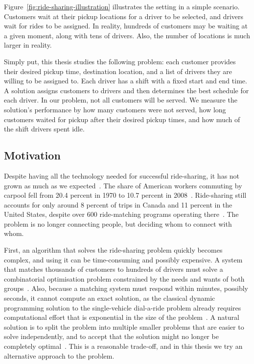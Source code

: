 Figure~\ref{fig:ride-sharing-illustration} illustrates the setting in a simple scenario. Customers wait at their pickup locations for a driver to be selected, and drivers wait for rides to be assigned. In reality, hundreds of customers may be waiting at a given moment, along with tens of drivers. Also, the number of locations is much larger in reality.

Simply put, this thesis studies the following problem: each customer provides their desired pickup time, destination location, and a list of drivers they are willing to be assigned to. Each driver has a shift with a fixed start and end time. A solution assigns customers to drivers and then determines the best schedule for each driver. In our problem, not all customers will be served. We measure the solution's performance by how many customers were not served, how long customers waited for pickup after their desired pickup times, and how much of the shift drivers spent idle.

\subsection{Motivation}

Despite having all the technology needed for successful ride-sharing, it has not grown as much as we expected~\citep{chan2012ridesharing}. The share of American workers commuting by carpool fell from 20.4 percent in 1970 to 10.7 percent in 2008~\citep{chan2012ridesharing}. Ride-sharing still accounts for only around 8 percent of trips in Canada and 11 percent in the United States, despite over 600 ride-matching programs operating there~\citep{chan2012ridesharing}. The problem is no longer connecting people, but deciding whom to connect with whom.

First, an algorithm that solves the ride-sharing problem quickly becomes complex, and using it can be time-consuming and possibly expensive. A system that matches thousands of customers to hundreds of drivers must solve a combinatorial optimisation problem constrained by the needs and wants of both groups~\citep{agatz2012optimization}. Also, because a matching system must respond within minutes, possibly seconds, it cannot compute an exact solution, as the classical dynamic programming solution to the single-vehicle dial-a-ride problem already requires computational effort that is exponential in the size of the problem~\citep{psaraftis1980dynamic,agatz2012optimization}. A natural solution is to split the problem into multiple smaller problems that are easier to solve independently, and to accept that the solution might no longer be completely optimal~\citep{agatz2012optimization}. This is a reasonable trade-off, and in this thesis we try an alternative approach to the problem.

